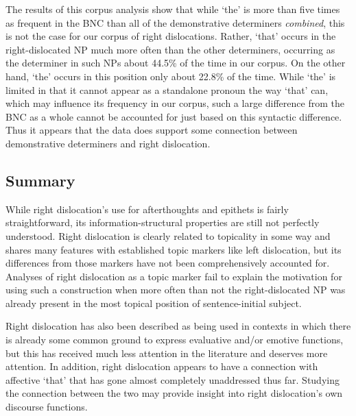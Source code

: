 \documentclass[titlepage,12pt]{article}
\begin{document}
The results of this corpus analysis show that while `the' is more than five times as frequent in the BNC than all of the demonstrative determiners \emph{combined}, this is not the case for our corpus of right dislocations. Rather, `that' occurs in the right-dislocated NP much more often than the other determiners, occurring as the determiner in such NPs about 44.5\% of the time in our corpus. On the other hand, `the' occurs in this position only about 22.8\% of the time. While `the' is limited in that it cannot appear as a standalone pronoun the way `that' can, which may influence its frequency in our corpus, such a large difference from the BNC as a whole cannot be accounted for just based on this syntactic difference. Thus it appears that the data does support some connection between demonstrative determiners and right dislocation.

\subsection{Summary}
While right dislocation's use for afterthoughts and epithets is fairly straightforward, its information-structural properties are still not perfectly understood. Right dislocation is clearly related to topicality in some way and shares many features with established topic markers like left dislocation, but its differences from those markers have not been comprehensively accounted for. Analyses of right dislocation as a topic marker fail to explain the motivation for using such a construction when more often than not the right-dislocated NP was already present in the most topical position of sentence-initial subject.

Right dislocation has also been described as being used in contexts in which there is already some common ground to express evaluative and/or emotive functions, but this has received much less attention in the literature and deserves more attention. In addition, right dislocation appears to have a connection with affective `that' that has gone almost completely unaddressed thus far. Studying the connection between the two may provide insight into right dislocation's own discourse functions.
\end{document}
